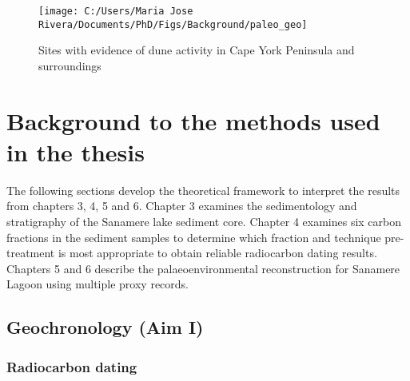 \documentclass[
  12pt,
]{book}
\begin{document}
\begin{figure}

{\centering \texttt{[image: C:/Users/Maria Jose Rivera/Documents/PhD/Figs/Background/paleo\_geo]} 

}

\caption{Sites with evidence of dune activity in Cape York Peninsula and surroundings}\label{fig:fig-geo}
\end{figure}



\hypertarget{background-to-the-methods-used-in-the-thesis}{%
\section{Background to the methods used in the thesis}\label{background-to-the-methods-used-in-the-thesis}}

The following sections develop the theoretical framework to interpret the results from chapters 3, 4, 5 and 6. Chapter 3 examines the sedimentology and stratigraphy of the Sanamere lake sediment core. Chapter 4 examines six carbon fractions in the sediment samples to determine which fraction and technique pre-treatment is most appropriate to obtain reliable radiocarbon dating results. Chapters 5 and 6 describe the palaeoenvironmental reconstruction for Sanamere Lagoon using multiple proxy records.

\hypertarget{geochronology-aim-i}{%
\subsection{Geochronology (Aim I)}\label{geochronology-aim-i}}

\hypertarget{hypy}{%
\subsubsection{Radiocarbon dating}\label{hypy}}
\end{document}
